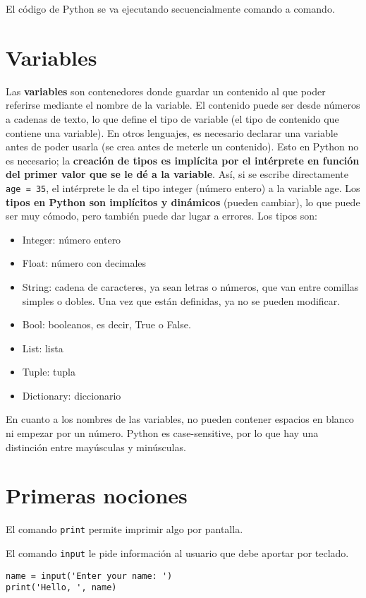 El código de Python se va ejecutando secuencialmente comando a comando. 

\section{Variables}
Las \textbf{variables} son contenedores donde guardar un contenido al que poder referirse mediante el nombre de la variable. El contenido puede ser desde números a cadenas de texto, lo que define el tipo de variable (el tipo de contenido que contiene una variable). En otros lenguajes, es necesario declarar una variable antes de poder usarla (se crea antes de meterle un contenido). Esto en Python no es necesario; la \textbf{creación de tipos es implícita por el intérprete en función del primer valor que se le dé a la variable}. Así, si se escribe directamente \texttt{age = 35}, el intérprete le da el tipo integer (número entero) a la variable age. Los \textbf{tipos en Python son implícitos y dinámicos} (pueden cambiar), lo que puede ser muy cómodo, pero también puede dar lugar a errores. Los tipos son:
\begin{itemize}
\item Integer: número entero
\item Float: número con decimales
\item String: cadena de caracteres, ya sean letras o números, que van entre comillas simples o dobles. Una vez que están definidas, ya no se pueden modificar.
\item Bool: booleanos, es decir, True o False.
\item List: lista
\item Tuple: tupla
\item Dictionary: diccionario
\end{itemize}

En cuanto a los nombres de las variables, no pueden contener espacios en blanco ni empezar por un número. Python es case-sensitive, por lo que hay una distinción entre mayúsculas y minúsculas. 

\section{Primeras nociones}
El comando \texttt{print} permite imprimir algo por pantalla. 

El comando \texttt{input} le pide información al usuario que debe aportar por teclado.

\begin{lstlisting}
name = input('Enter your name: ')
print('Hello, ', name)
\end{lstlisting}

